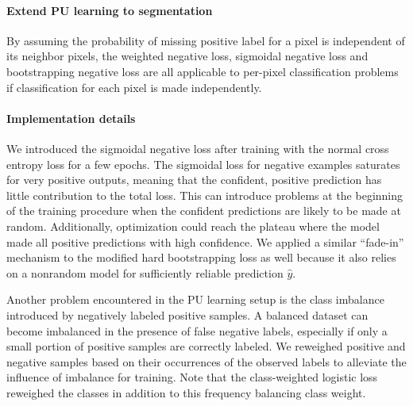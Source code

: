 \paragraph{Extend PU learning to segmentation}

By assuming the probability of missing positive label for a pixel is independent of its neighbor pixels, the weighted negative loss, sigmoidal negative loss and bootstrapping negative loss are all applicable to per-pixel classification problems if classification for each pixel is made independently.


\paragraph{Implementation details}

We introduced the sigmoidal negative loss after training with the normal cross entropy loss for a few epochs.
The sigmoidal loss for negative examples saturates for very positive outputs, meaning that the confident, positive prediction has little contribution to the total loss.
This can introduce problems at the beginning of the training procedure when the confident predictions are likely to be made at random.
Additionally, optimization could reach the plateau where the model made all positive predictions with high confidence.
We applied a similar ``fade-in'' mechanism to the modified hard bootstrapping loss as well because it also relies on a nonrandom model for sufficiently reliable prediction $\hat{y}$.



Another problem encountered in the PU learning setup is the class imbalance introduced by negatively labeled positive samples.
A balanced dataset can become imbalanced in the presence of false negative labels, especially if only a small portion of positive samples are correctly labeled.
We reweighed positive and negative samples based on their occurrences of the observed labels to alleviate the influence of imbalance for training.
Note that the class-weighted logistic loss reweighed the classes in addition to this frequency balancing class weight.
